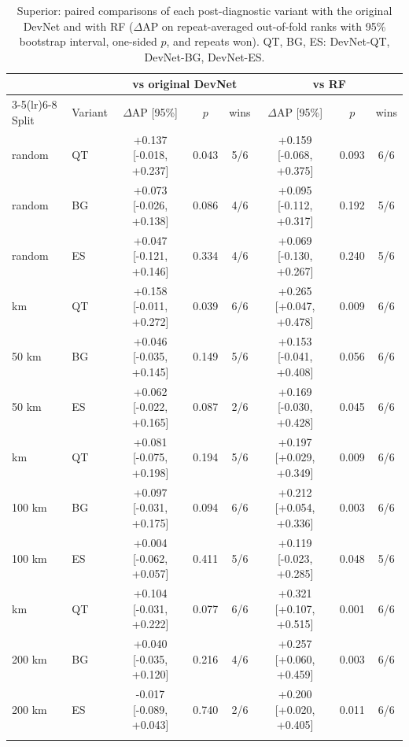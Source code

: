 \documentclass[pdflatex,sn-apa]{sn-jnl}
\begin{document}
\begin{appendices}
\begin{table}[!h]
\caption{Superior: paired comparisons of each post-diagnostic variant with the original DevNet and with RF ($\Delta$AP on repeat-averaged out-of-fold ranks with 95\% bootstrap interval, one-sided $p$, and repeats won). QT, BG, ES: DevNet-QT, DevNet-BG, DevNet-ES.}\label{tab:sensitivity-sup}
\scriptsize
\setlength{\tabcolsep}{2.5pt}
\begin{tabular*}{\textwidth}{@{\extracolsep\fill}llcccccc}
\toprule
 & & \multicolumn{3}{c}{vs original DevNet} & \multicolumn{3}{c}{vs RF} \\
\cmidrule(lr){3-5}\cmidrule(lr){6-8}
Split & Variant & $\Delta$AP [95\%] & $p$ & wins & $\Delta$AP [95\%] & $p$ & wins \\
\midrule
random & QT & +0.137 [-0.018, +0.237] & 0.043 & 5/6 & +0.159 [-0.068, +0.375] & 0.093 & 6/6 \\
random & BG & +0.073 [-0.026, +0.138] & 0.086 & 4/6 & +0.095 [-0.112, +0.317] & 0.192 & 5/6 \\
random & ES & +0.047 [-0.121, +0.146] & 0.334 & 4/6 & +0.069 [-0.130, +0.267] & 0.240 & 5/6 \\
\addlinespace
50 km & QT & +0.158 [-0.011, +0.272] & 0.039 & 6/6 & +0.265 [+0.047, +0.478] & 0.009 & 6/6 \\
50 km & BG & +0.046 [-0.035, +0.145] & 0.149 & 5/6 & +0.153 [-0.041, +0.408] & 0.056 & 6/6 \\
50 km & ES & +0.062 [-0.022, +0.165] & 0.087 & 2/6 & +0.169 [-0.030, +0.428] & 0.045 & 6/6 \\
\addlinespace
100 km & QT & +0.081 [-0.075, +0.198] & 0.194 & 5/6 & +0.197 [+0.029, +0.349] & 0.009 & 6/6 \\
100 km & BG & +0.097 [-0.031, +0.175] & 0.094 & 6/6 & +0.212 [+0.054, +0.336] & 0.003 & 6/6 \\
100 km & ES & +0.004 [-0.062, +0.057] & 0.411 & 5/6 & +0.119 [-0.023, +0.285] & 0.048 & 5/6 \\
\addlinespace
200 km & QT & +0.104 [-0.031, +0.222] & 0.077 & 6/6 & +0.321 [+0.107, +0.515] & 0.001 & 6/6 \\
200 km & BG & +0.040 [-0.035, +0.120] & 0.216 & 4/6 & +0.257 [+0.060, +0.459] & 0.003 & 6/6 \\
200 km & ES & -0.017 [-0.089, +0.043] & 0.740 & 2/6 & +0.200 [+0.020, +0.405] & 0.011 & 6/6 \\
\botrule
\end{tabular*}
\end{table}

\end{appendices}

\clearpage


\end{document}
